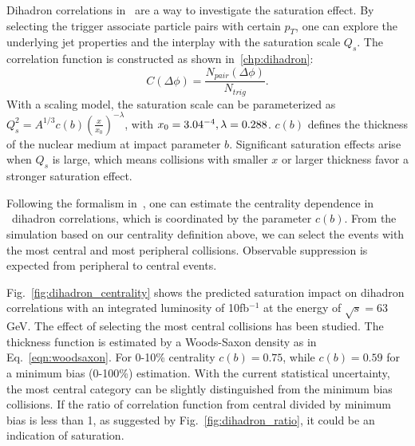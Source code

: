 Dihadron correlations in \eA\ are a way to investigate the saturation effect. By
selecting the trigger associate particle pairs with certain $p_{T}$, one can
explore the underlying jet properties and the interplay with the saturation
scale $Q_{s}$. The correlation function is constructed as shown in~\ref{chp:dihadron}:
\begin{equation}
C(\Delta\phi)=\frac{N_{pair}(\Delta\phi)}{N_{trig}}.
\end{equation}
With a scaling model, the saturation scale can be parameterized as
$Q_{s}^{2}=A^{1/3} c(b)(\frac{x}{x_{0}})^{-\lambda}$, with $x_{0}=3.04\time
10^{-4}, \lambda = 0.288$. $c(b)$ defines the thickness of the nuclear medium at
impact parameter $b$. Significant saturation effects arise when $Q_{s}$ is
large, which means collisions with smaller $x$ or larger thickness favor a
stronger saturation effect.

Following the formalism in~\cite{Zheng:2014vka}, one can estimate the centrality
dependence in \eA\ dihadron correlations, which is coordinated by the parameter $c(b)$.
From the simulation based on our centrality definition above, we can select the
events with the most central and most peripheral collisions. Observable suppression
is expected from peripheral to central events.

Fig.~\ref{fig:dihadron_centrality} shows the predicted saturation impact on dihadron correlations with an integrated luminosity of 10fb$^{-1}$ at the energy of $\sqrt{s}=63$ GeV.
The effect of selecting the most central collisions has been studied. The thickness function is estimated by
a Woods-Saxon density as in Eq.~\ref{eqn:woodsaxon}. For 0-10\% centrality $c(b)=0.75$, while $c(b)=0.59$
for a minimum bias (0-100\%) estimation. With the current statistical uncertainty, the most central category can be slightly distinguished from the minimum bias collisions. If the ratio of correlation function from central divided by minimum bias is less than 1, as suggested by Fig.~\ref{fig:dihadron_ratio}, it could be an indication of saturation.


